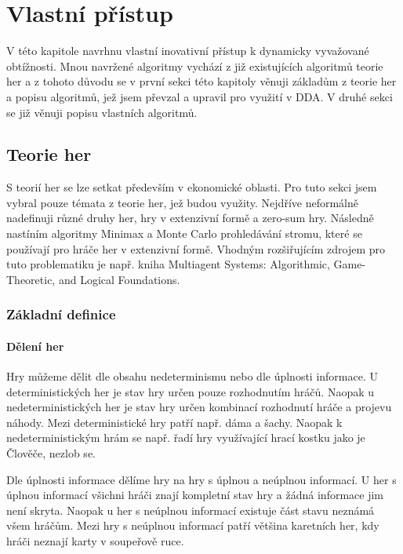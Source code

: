 \chapter{Vlastní přístup}

V této kapitole navrhnu vlastní inovativní přístup k dynamicky vyvažované obtížnosti. Mnou navržené algoritmy vychází z již existujících algoritmů teorie her a z tohoto důvodu se v první sekci této kapitoly věnuji základům z teorie her a popisu algoritmů, jež jsem převzal a upravil pro využití v DDA. V druhé sekci se již věnuji popisu vlastních algoritmů.

\section{Teorie her}

S teorií her se lze setkat především v ekonomické oblasti. Pro tuto sekci jsem vybral pouze témata z teorie her, jež budou využity. Nejdříve neformálně nadefinuji různé druhy her, hry v extenzivní formě a zero-sum hry. Následně nastíním algoritmy Minimax a Monte Carlo prohledávání stromu, které se používají pro hráče her v extenzivní formě. Vhodným rozšiřujícím zdrojem pro tuto problematiku je např. kniha Multiagent Systems: Algorithmic, Game-Theoretic, and Logical Foundations\cite{Shoham:2008:MSA:1483085}.

\subsection{Základní definice}

\subsubsection{Dělení her}

Hry můžeme dělit dle obsahu nedeterminismu nebo dle úplnosti informace. U deterministických her je stav hry určen pouze rozhodnutím hráčů. Naopak u nedeterministických her je stav hry určen kombinací rozhodnutí hráče a projevu náhody. Mezi deterministické hry patří např. dáma a šachy. Naopak k nedeterministickým hrám se např. řadí hry využívající hrací kostku jako je Člověče, nezlob se.

Dle úplnosti informace dělíme hry na hry s úplnou a neúplnou informací. U her s úplnou informací všichni hráči znají kompletní stav hry a žádná informace jim není skryta. Naopak u her s neúplnou informací existuje část stavu neznámá všem hráčům. Mezi hry s neúplnou informací patří většina karetních her, kdy hráči neznají karty v soupeřově ruce.

